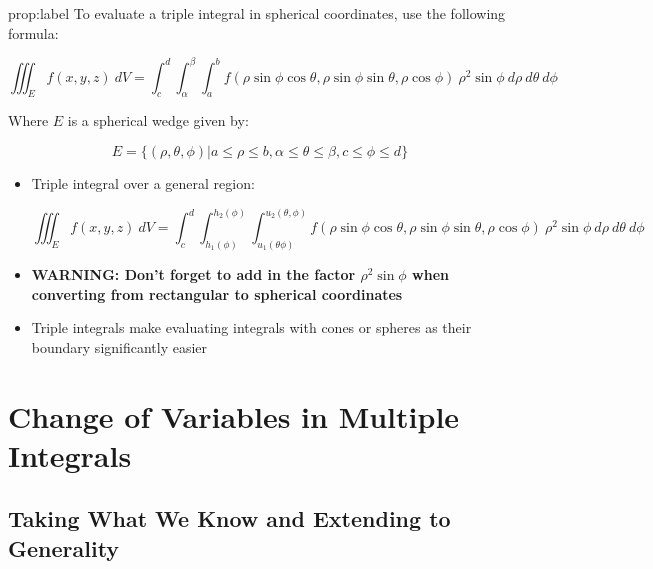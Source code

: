 \documentclass{package/notes}
\begin{document}
\begin{proposition}{prop:label}
	To evaluate a triple integral in spherical coordinates, use the following formula:

	$$\iiint_Ef(x,y,z)\:dV=\int_c^d\int_\alpha^\beta\int_a^bf(\rho\sin\phi\cos\theta,\rho\sin\phi\sin\theta,\rho\cos\phi)\:\rho^2\sin\phi\:d\rho\:d\theta\:d\phi$$

	Where $E$ is a spherical wedge given by:

	$$E = \{(\rho,\theta,\phi)|a\le\rho\le b, \alpha\le\theta\le\beta,c\le\phi\le d\}$$
\end{proposition}

\begin{itemize}
	\item Triple integral over a general region: 
	
	$$\iiint_Ef(x,y,z)\:dV=\int_c^d\int_{h_1(\phi)}^{h_2(\phi)}\int_{u_1(\theta\phi)}^{u_2(\theta,\phi)}f(\rho\sin\phi\cos\theta,\rho\sin\phi\sin\theta,\rho\cos\phi)\:\rho^2\sin\phi\:d\rho\:d\theta\:d\phi$$

	\item \textbf{WARNING: Don't forget to add in the factor $\rho^2\sin\phi$ when converting from rectangular to spherical coordinates}
	\item Triple integrals make evaluating integrals with cones or spheres as their boundary significantly easier
\end{itemize}




\section{Change of Variables in Multiple Integrals}


\subsection{Taking What We Know and Extending to Generality}
\end{document}
